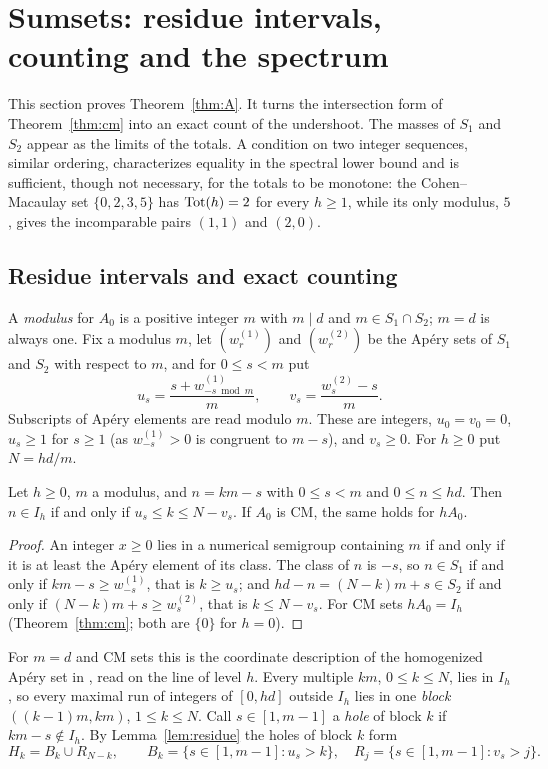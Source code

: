 \section{Sumsets: residue intervals, counting and the spectrum}\label{sec:sumsets}

This section proves Theorem~\ref{thm:A}. It turns the intersection form of Theorem~\ref{thm:cm} into an exact count of the undershoot. The masses of $S_1$ and $S_2$ appear as the limits of the totals. A condition on two integer sequences, similar ordering, characterizes equality in the spectral lower bound and is sufficient, though not necessary, for the totals to be monotone: the Cohen--Macaulay set $\{0,2,3,5\}$ has $\operatorname{Tot}(h)=2$ for every $h\ge1$, while its only modulus, $5$, gives the incomparable pairs $(1,1)$ and $(2,0)$.

\subsection{Residue intervals and exact counting}\label{subsec:counting}

A \emph{modulus} for $A_0$ is a positive integer $m$ with $m\mid d$ and $m\in S_1\cap S_2$; $m=d$ is always one. Fix a modulus $m$, let $(w^{(1)}_r)$ and $(w^{(2)}_r)$ be the Ap\'ery sets of $S_1$ and $S_2$ with respect to $m$, and for $0\le s<m$ put
\[
u_s=\frac{s+w^{(1)}_{-s\bmod m}}{m},\qquad v_s=\frac{w^{(2)}_s-s}{m}.
\]
Subscripts of Ap\'ery elements are read modulo $m$. These are integers, $u_0=v_0=0$, $u_s\ge1$ for $s\ge1$ (as $w^{(1)}_{-s}>0$ is congruent to $m-s$), and $v_s\ge0$. For $h\ge0$ put $N=hd/m$.

\begin{lemma}\label{lem:residue}
Let $h\ge0$, $m$ a modulus, and $n=km-s$ with $0\le s<m$ and $0\le n\le hd$. Then $n\in I_h$ if and only if $u_s\le k\le N-v_s$. If $A_0$ is CM, the same holds for $hA_0$.
\end{lemma}

\begin{proof}
An integer $x\ge0$ lies in a numerical semigroup containing $m$ if and only if it is at least the Ap\'ery element of its class. The class of $n$ is $-s$, so $n\in S_1$ if and only if $km-s\ge w^{(1)}_{-s}$, that is $k\ge u_s$; and $hd-n=(N-k)m+s\in S_2$ if and only if $(N-k)m+s\ge w^{(2)}_s$, that is $k\le N-v_s$. For CM sets $hA_0=I_h$ (Theorem~\ref{thm:cm}; both are $\{0\}$ for $h=0$).
\end{proof}

For $m=d$ and CM sets this is the coordinate description of the homogenized Ap\'ery set in \cite[Prop.~2.6(3)]{GimenezGonzalezSanchez2023}, read on the line of level $h$. Every multiple $km$, $0\le k\le N$, lies in $I_h$, so every maximal run of integers of $[0,hd]$ outside $I_h$ lies in one \emph{block} $((k-1)m,km)$, $1\le k\le N$. Call $s\in[1,m-1]$ a \emph{hole} of block $k$ if $km-s\notin I_h$. By Lemma~\ref{lem:residue} the holes of block $k$ form
\begin{equation}\label{eq:holes}
H_k=B_k\cup R_{N-k},\qquad B_k=\{s\in[1,m-1]:u_s>k\},\quad R_j=\{s\in[1,m-1]:v_s>j\}.
\end{equation}

